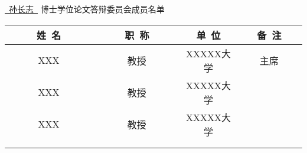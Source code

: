 \newpage
\thispagestyle{empty}
\vspace*{2em}

\begin{center}\STSong{}
 \underline{\ 孙长志\ } 博士学位论文答辩委员会成员名单
\end{center}

\begin{center}
\renewcommand{\arraystretch}{1.4}
  \begin{tabular}{|c|c|c|c|} \hline
   ~~~~~姓~名~~~~~ & ~~~~~职~称~~~~~ 
   & \hspace{6em}单~位\hspace{6em} & ~~~备~注~~~\\\hline
         XXX    &   教授    &  XXXXX大学  & 主席  \\ \hline
         XXX    &   教授    &  XXXXX大学  &       \\ \hline
         XXX    &   教授    &  XXXXX大学  &       \\ \hline
                &           &                   &       \\ \hline
                &           &                   &       \\ \hline
  \end{tabular}
\end{center}
